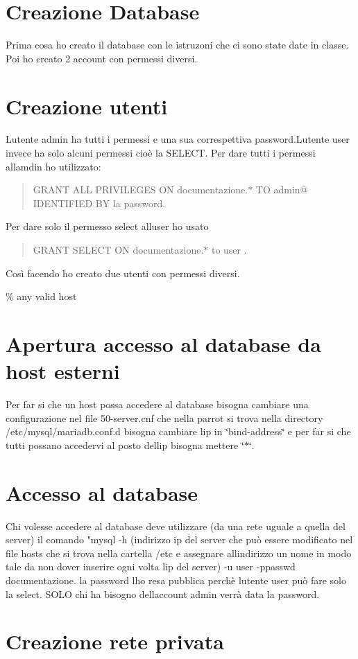 \section*{Creazione Database}

Prima cosa ho creato il database con le istruzoni che ci sono state date in classe. Poi ho creato 2 account con permessi diversi.

\section*{Creazione utenti}

L\textquotesingle{}utente admin ha tutti i permessi e una sua correspettiva password.\+L\textquotesingle{}utente user invece ha solo alcuni permessi cioè la S\+E\+L\+E\+CT. Per dare tutti i permessi all\textquotesingle{}amdin ho utilizzato\+: \begin{quote}
G\+R\+A\+NT A\+LL P\+R\+I\+V\+I\+L\+E\+G\+ES ON documentazione.$\ast$ TO admin@\textquotesingle{}\textquotesingle{} I\+D\+E\+N\+T\+I\+F\+I\+ED BY \textquotesingle{}la password\textquotesingle{}. \end{quote}


Per dare solo il permesso select all\textquotesingle{}user ho usato \begin{quote}
G\+R\+A\+NT S\+E\+L\+E\+CT ON documentazione.$\ast$ to user . \end{quote}


Così facendo ho creato due utenti con permessi diversi.

\% any valid host

\section*{Apertura accesso al database da host esterni}

Per far si che un host possa accedere al database bisogna cambiare una configurazione nel file 50-\/server.\+cnf che nella parrot si trova nella directory /etc/mysql/mariadb.conf.\+d bisogna cambiare l\textquotesingle{}ip in \char`\"{}bind-\/address\char`\"{} e per far si che tutti possano accedervi al posto dell\textquotesingle{}ip bisogna mettere \char`\"{}$\ast$\char`\"{}.

\section*{Accesso al database}

Chi volesse accedere al database deve utilizzare (da una rete uguale a quella del server) il comando "mysql -\/h (indirizzo ip del server che può essere modificato nel file hosts che si trova nella cartella /etc e assegnare all\textquotesingle{}indirizzo un nome in modo tale da non dover inserire ogni volta l\textquotesingle{}ip del server) -\/u user -\/ppasswd documentazione. la password l\textquotesingle{}ho resa pubblica perchè l\textquotesingle{}utente user può fare solo la select. S\+O\+LO chi ha bisogno dell\textquotesingle{}account admin verrà data la password. \section*{Creazione rete privata}

